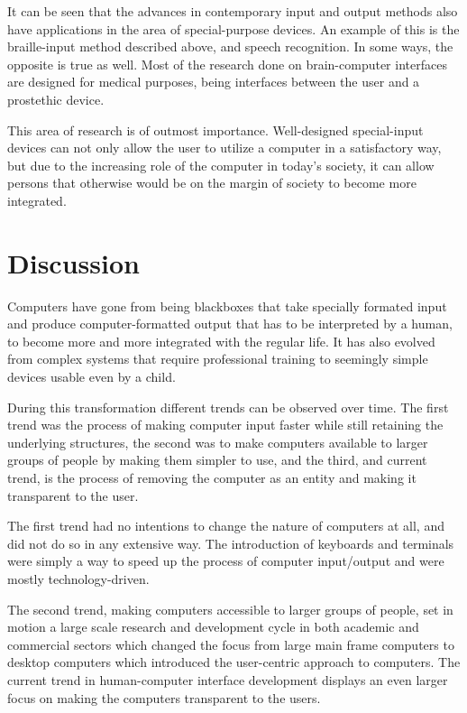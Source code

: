 It can be seen that the advances in contemporary input and output methods also have applications in the area of special-purpose devices. An example of this is the braille-input method described above, and speech recognition. In some ways, the opposite is true as well. Most of the research done on brain-computer interfaces are designed for medical purposes, being interfaces between the user and a prostethic device.

This area of research is of outmost importance. Well-designed special-input devices can not only allow the user to utilize a computer in a satisfactory way, but due to the increasing role of the computer in today's society, it can allow persons that otherwise would be on the margin of society to become more integrated.

\section{Discussion}


Computers have gone from being blackboxes that take specially formated input and produce computer-formatted output that has to be interpreted by a human, to become more and more integrated with the regular life. It has also evolved from complex systems that require professional training to seemingly simple devices usable even by a child.

During this transformation different trends can be observed over time. The first trend was the process of making computer input faster while still retaining the underlying structures, the second was to make computers available to larger groups of people by making them simpler to use, and the third, and current trend, is the process of removing the computer as an entity and making it transparent to the user.

The first trend had no intentions to change the nature of computers at all, and did not do so in any extensive way. The introduction of keyboards and terminals were simply a way to speed up the process of computer input/output and were mostly technology-driven. 

The second trend, making computers accessible to larger groups of people, set in motion a large scale research and development cycle in both academic and commercial sectors which changed the focus from large main frame computers to desktop computers which introduced the user-centric approach to computers. The current trend in human-computer interface development displays an even larger focus on making the computers transparent to the users.

